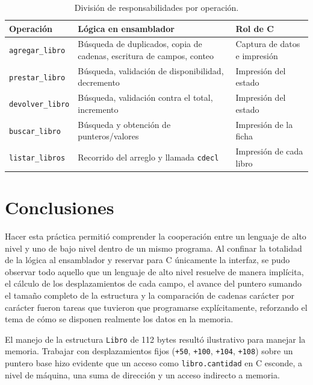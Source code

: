 \documentclass[a4paper,12pt]{article}
\begin{document}
\begin{table}[H]
\centering
\caption{División de responsabilidades por operación.}
\label{tab:resumen_ops}
\small
\renewcommand{\arraystretch}{1.25}
\begin{tabular}{
    >{\raggedright\arraybackslash}p{2.8cm}
    >{\raggedright\arraybackslash}p{7.0cm}
    >{\raggedright\arraybackslash}p{2.8cm}
}
\toprule
\rowcolor{VerdeUABC}
\color{white}\textbf{Operación} &
\color{white}\textbf{Lógica en ensamblador} &
\color{white}\textbf{Rol de C} \\
\midrule
\rowcolor{rowLight}
\texttt{agregar\_libro} & Búsqueda de duplicados, copia de cadenas, escritura de campos, conteo & Captura de datos e impresión \\
\texttt{prestar\_libro} & Búsqueda, validación de disponibilidad, decremento & Impresión del estado \\
\rowcolor{rowLight}
\texttt{devolver\_libro} & Búsqueda, validación contra el total, incremento & Impresión del estado \\
\texttt{buscar\_libro} & Búsqueda y obtención de punteros/valores & Impresión de la ficha \\
\rowcolor{rowLight}
\texttt{listar\_libros} & Recorrido del arreglo y llamada \texttt{cdecl} & Impresión de cada libro \\
\bottomrule
\end{tabular}
\end{table}

\section{Conclusiones}
Hacer esta práctica permitió comprender la cooperación entre un lenguaje de alto nivel y uno de bajo nivel dentro de un mismo programa. Al confinar la totalidad de la lógica al ensamblador y reservar para C únicamente la interfaz, se pudo observar todo aquello que un lenguaje de alto nivel resuelve de manera implícita, el cálculo de los desplazamientos de cada campo, el avance del puntero sumando el tamaño completo de la estructura y la comparación de cadenas carácter por carácter fueron tareas que tuvieron que programarse explícitamente, reforzando el tema de cómo se disponen realmente los datos en la memoria.

El manejo de la estructura \texttt{Libro} de 112 bytes resultó ilustrativo para manejar la memoria. Trabajar con desplazamientos fijos (\texttt{+50}, \texttt{+100}, \texttt{+104}, \texttt{+108}) sobre un puntero base hizo evidente que un acceso como \texttt{libro.cantidad} en C esconde, a nivel de máquina, una suma de dirección y un acceso indirecto a memoria.
\end{document}
